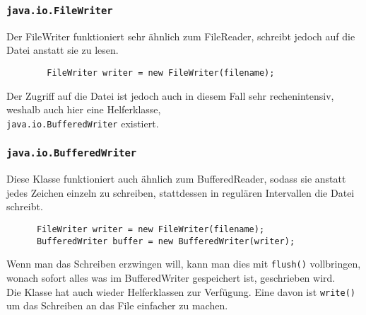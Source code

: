 \documentclass{article}
\begin{document}
	  \cprotect\subsubsection{\texorpdfstring{\verb|java.io.FileWriter|}{}}
	  Der FileWriter funktioniert sehr ähnlich zum FileReader, schreibt jedoch auf die Datei anstatt sie zu lesen. 
	  \begin{verbatim}
	  	FileWriter writer = new FileWriter(filename);  
	  \end{verbatim}  
	  Der Zugriff auf die Datei ist jedoch auch in diesem Fall sehr rechenintensiv, weshalb auch hier eine Helferklasse, \\ \verb|java.io.BufferedWriter| existiert.
	  \cprotect\subsubsection{\texorpdfstring{\verb|java.io.BufferedWriter|}{}}
	  Diese Klasse funktioniert auch ähnlich zum BufferedReader, sodass sie anstatt jedes Zeichen einzeln zu schreiben, stattdessen in regulären Intervallen die Datei schreibt. 
	  \begin{verbatim}
	  FileWriter writer = new FileWriter(filename);
	  BufferedWriter buffer = new BufferedWriter(writer);
	  \end{verbatim}
	  Wenn man das Schreiben erzwingen will, kann man dies mit \verb|flush()| vollbringen, wonach sofort alles was im BufferedWriter gespeichert ist, geschrieben wird. \\
	  Die Klasse hat auch wieder Helferklassen zur Verfügung. Eine davon ist \verb|write()| um das Schreiben an das File einfacher zu machen.  
\end{document}
